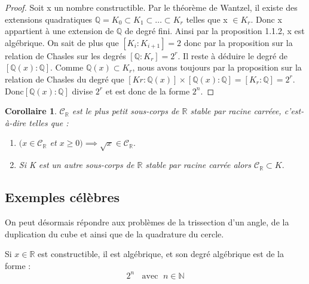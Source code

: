 \documentclass[a4paper,12pt,french,draft]{report}
\newtheorem{corollaire}{Corollaire}[section]
\begin{document}
		     \begin{proof}
		     Soit x un nombre constructible. Par le théorème de Wantzel, il 
		     existe des extensions quadratiques \( \mathbb{Q} = K_{0} 
		     \subset K_{1} \subset \dots \subset K_{r} \) telles que x 
		     \( \in K_{r} \). Donc x appartient à une extension de \( 
		     \mathbb{Q} \) de degré fini. Ainsi par la proposition 
		     1.1.2, x est algébrique. On sait de plus que \( 
		     [K_{i}:K_{i+1}] = 2 \) donc par la proposition sur 
		     la relation de Chasles sur les degrés \( 
		     [\mathbb{Q}:K_{r}] 
		     = 2^{r} \). Il reste à déduire le degré de \( 
		     [\mathbb{Q}(x):\mathbb{Q}] \). Comme \( \mathbb{Q}(x) \subset K_{r} 
		     \), nous avons toujours par la proposition sur la relation 
		     de Chasles du degré que \( [K{r}:\mathbb{Q}(x)]\times 
		     [\mathbb{Q}(x):\mathbb{Q}] = [K_{r}:\mathbb{Q}] = 2^{r}. 
		     \)Donc\( [\mathbb{Q}(x):\mathbb{Q}] \) divise \(2^{r}\) et est donc 
		     de la forme \(2^{n}\).
		     \end{proof} 
		     
		     \begin{corollaire}
		     
		     \(\mathscr{C}_{\mathbb{R}} \) est le plus petit sous-corps 
		     de \(\mathbb{R}\) stable par racine carréee, c'est-à-dire 
		     telles que :
		     \begin{enumerate}
		      \item \( (x \in \mathscr{C}_{\mathbb{R}}\) et \(x \geq 0) 
		      \implies \sqrt{x} \in \mathscr{C}_{\mathbb{R}}.\)
		      \item Si K est un autre sous-corps de \(\mathbb{R}\) 
		      stable par racine carrée alors \(\mathscr{C}_{\mathbb{R}} 
		      \subset K.\)
		      
		     \end{enumerate}
		     
		     \end{corollaire}
		
		
		\subsection{Exemples célèbres}
		
        On peut désormais répondre aux problèmes de la trissection 
        d'un angle, de la duplication du cube et ainsi que de la 
        quadrature du cercle.
        
			\begin{proposition}
			Si $x\in\mathbb{R}$ est constructible, il est algébrique, et son degré algébrique est de la forme : 
			\[{}
				2^{n}\;\;\mbox{ avec }\;n\in\mathbb{N}
			\]
			\end{proposition}
             
\end{document}
